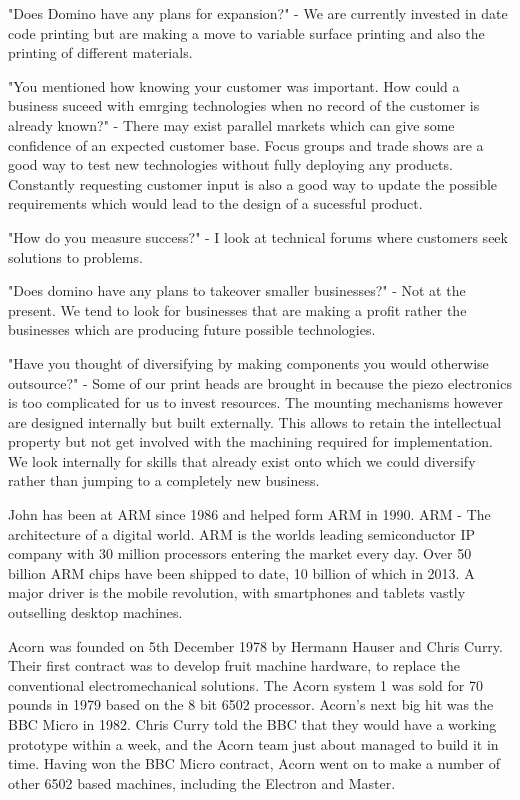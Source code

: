 "Does Domino have any plans for expansion?" - 
We are currently invested in date code printing but are making a move to variable surface printing and also the printing of different materials.

"You mentioned how knowing your customer was important. How could a business suceed with emrging technologies when no record of the customer is already known?" -
There may exist parallel markets which can give some confidence of an expected customer base.
Focus groups and trade shows are a good way to test new technologies without fully deploying any products.
Constantly requesting customer input is also a good way to update the possible requirements which would lead to the design of a sucessful product.

"How do you measure success?" -
I look at technical forums where customers seek solutions to problems.

"Does domino have any plans to takeover smaller businesses?" -
Not at the present.
We tend to look for businesses that are making a profit rather the businesses which are producing future possible technologies.

"Have you thought of diversifying by making components you would otherwise outsource?" - 
Some of our print heads are brought in because the piezo electronics is too complicated for us to invest resources.
The mounting mechanisms however are designed internally but built externally. 
This allows to retain the intellectual property but not get involved with the machining required for implementation.
We look internally for skills that already exist onto which we could diversify rather than jumping to a completely new business. 

John has been at ARM since 1986 and helped form ARM in 1990. 
ARM - The architecture of a digital world.
ARM is the worlds leading semiconductor IP company with 30 million processors entering the market every day.
Over 50 billion ARM chips have been shipped to date, 10 billion of which in 2013. 
A major driver is the mobile revolution, with smartphones and tablets vastly outselling desktop machines.

Acorn was founded on 5th December 1978 by Hermann Hauser and Chris Curry. 
Their first contract was to develop fruit machine hardware, to replace the conventional electromechanical solutions. 
The Acorn system 1 was sold for 70 pounds in 1979 based on the 8 bit 6502 processor. 
Acorn's next big hit was the BBC Micro in 1982. 
Chris Curry told the BBC that they would have a working prototype within a week, and the Acorn team just about managed to build it in time. 
Having won the BBC Micro contract, Acorn went on to make a number of other 6502 based machines, including the Electron and Master.

